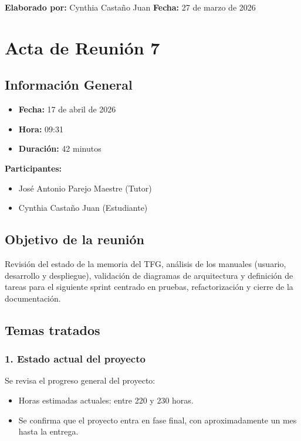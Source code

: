 \textbf{Elaborado por:} Cynthia Castaño Juan \hfill \textbf{Fecha:} 27 de marzo de 2026

\newpage

\section*{Acta de Reunión 7}

\subsection*{Información General}
\begin{itemize}
    \item \textbf{Fecha:} 17 de abril de 2026
    \item \textbf{Hora:} 09:31
    \item \textbf{Duración:} 42 minutos
\end{itemize}

\textbf{Participantes:}
\begin{itemize}
    \item José Antonio Parejo Maestre (Tutor)
    \item Cynthia Castaño Juan (Estudiante)
\end{itemize}

\subsection*{Objetivo de la reunión}
Revisión del estado de la memoria del TFG, análisis de los manuales (usuario, desarrollo y despliegue), validación de diagramas de arquitectura y definición de tareas para el siguiente sprint centrado en pruebas, refactorización y cierre de la documentación.

\subsection*{Temas tratados}

\subsubsection*{1. Estado actual del proyecto}
Se revisa el progreso general del proyecto:

\begin{itemize}
    \item Horas estimadas actuales: entre 220 y 230 horas.
    \item Se confirma que el proyecto entra en fase final, con aproximadamente un mes hasta la entrega.
\end{itemize}

